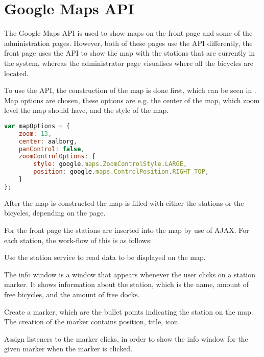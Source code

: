 \section{Google Maps API}\label{sec:googlemapsapi}
The Google Maps API \citep{misc:googlemapsapi} is used to show maps on the front page and some of the administration pages.
However, both of these pages use the API differently, the front page uses the API to show the map with the stations that are currently in the system, whereas the administrator page visualises where all the bicycles are located.

To use the API, the construction of the map is done first, which can be seen in .
Map options are chosen, these options are e.g. the center of the map, which zoom level the map should have, and the style of the map.

\begin{minipage}{\textwidth}
\begin{lstlisting}[caption={Construction of the map}, label={lst:mapoptions}, language=Javascript]
var mapOptions = {
	zoom: 13,
	center: aalborg,
	panControl: false,
    zoomControlOptions: {
		style: google.maps.ZoomControlStyle.LARGE,
		position: google.maps.ControlPosition.RIGHT_TOP,
	}
};
\end{lstlisting}
\end{minipage}

After the map is constructed the map is filled with either the stations or the bicycles, depending on the page.

For the front page the stations are inserted into the map by use of AJAX.
For each station, the work-flow of this is as follows:

\begin{description}[style=nextline]
	\item[Gather data]
	Use the station service to read data to be displayed on the map.
	\item[Create info window]
	The info window is a window that appears whenever the user clicks on a station marker.
	It shows information about the station, which is the name, amount of free bicycles, and the amount of free docks.
	\item[Marker creation]
	Create a marker, which are the bullet points indicating the station on the map.
	The creation of the marker contains position, title, icon.
	\item[Assign listeners]
	Assign listeners to the marker clicks, in order to show the info window for the given marker when the marker is clicked.
\end{description}

